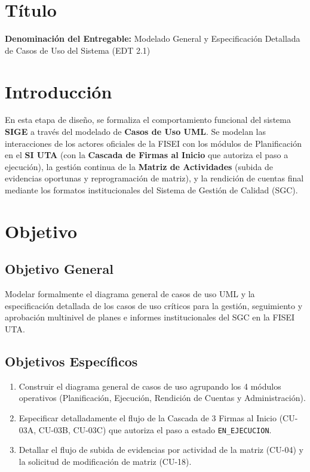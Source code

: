 \documentclass[12pt,a4paper]{article}
\begin{document}

\vspace{0.25cm}
\section{Título}
\textbf{Denominación del Entregable:} Modelado General y Especificación Detallada de Casos de Uso del Sistema (EDT 2.1)



\section{Introducción}
En esta etapa de diseño, se formaliza el comportamiento funcional del sistema \textbf{SIGE} a través del modelado de \textbf{Casos de Uso UML}. Se modelan las interacciones de los actores oficiales de la FISEI con los módulos de Planificación en el \textbf{SI UTA} (con la \textbf{Cascada de Firmas al Inicio} que autoriza el paso a ejecución), la gestión continua de la \textbf{Matriz de Actividades} (subida de evidencias oportunas y reprogramación de matriz), y la rendición de cuentas final mediante los formatos institucionales del Sistema de Gestión de Calidad (SGC).

\section{Objetivo}

\subsection{Objetivo General}
Modelar formalmente el diagrama general de casos de uso UML y la especificación detallada de los casos de uso críticos para la gestión, seguimiento y aprobación multinivel de planes e informes institucionales del SGC en la FISEI UTA.

\subsection{Objetivos Específicos}
\begin{enumerate}[leftmargin=1.5em, itemsep=2pt, topsep=2pt]
    \item Construir el diagrama general de casos de uso agrupando los 4 módulos operativos (Planificación, Ejecución, Rendición de Cuentas y Administración).
    \item Especificar detalladamente el flujo de la Cascada de 3 Firmas al Inicio (CU-03A, CU-03B, CU-03C) que autoriza el paso a estado \texttt{EN\_EJECUCION}.
    \item Detallar el flujo de subida de evidencias por actividad de la matriz (CU-04) y la solicitud de modificación de matriz (CU-18).
\end{enumerate}
\end{document}
